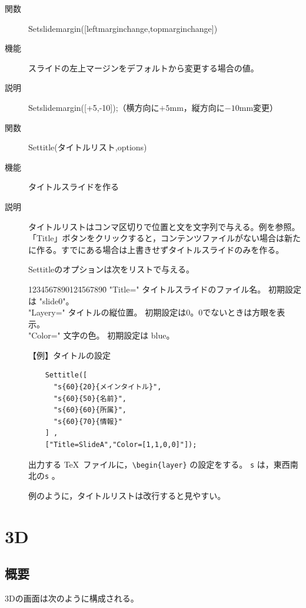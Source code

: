 \documentclass[papersize,a4paper,12pt,uplatex]{jsarticle}
\begin{document}
\begin{description}
\vspace{\baselineskip}
\hypertarget{setslidemargin}{}
\item[関数]  Setslidemargin([leftmarginchange,topmarginchange])
\item[機能]  スライドの左上マージンをデフォルトから変更する場合の値。
\item[説明]  Setslidemargin([+5,-10]);（横方向に$+5$mm，縦方向に$-10$mm変更）

\vspace{\baselineskip}
\hypertarget{settitle}{}
\item[関数]  Settitle(タイトルリスト,options)
\item[機能]  タイトルスライドを作る
\item[説明]  タイトルリストはコンマ区切りで位置と文を文字列で与える。例を参照。
「Title」ボタンをクリックすると，コンテンツファイルがない場合は新たに作る。すでにある場合は上書きせずタイトルスライドのみを作る。

Settitleのオプションは次をリストで与える。

\begin{tabbing}
123456789012\=4567890\=\kill
"Title=" \> タイトルスライドのファイル名。 初期設定は "slide0"。\\
"Layery=" \> タイトルの縦位置。 初期設定は0。0でないときは方眼を表示。 \\
"Color="\> 文字の色。 初期設定は blue。
\end{tabbing}

\vspace{\baselineskip}
【例】タイトルの設定

\begin{verbatim}
    Settitle([ 
      "s{60}{20}{メインタイトル}", 
      "s{60}{50}{名前}", 
      "s{60}{60}{所属}", 
      "s{60}{70}{情報}" 
    ] , 
    ["Title=SlideA","Color=[1,1,0,0]"]); 
\end{verbatim}

出力する \TeX\ ファイルに，\verb|\begin{layer}| の設定をする。 \verb|s| は，東西南北の\verb|s|  。

例のように，タイトルリストは改行すると見やすい。

\end{description}
\newpage
\section{\ketcindy 3D}
\subsection{概要}
\ketcindy 3Dの画面は次のように構成される。
\end{document}
